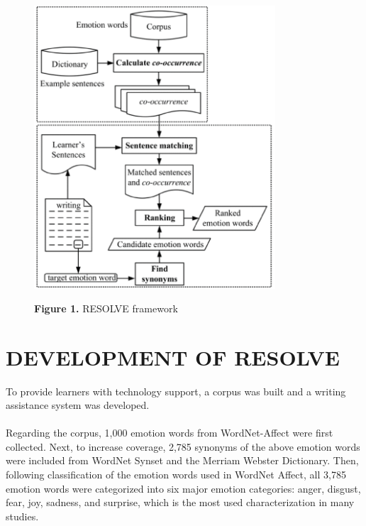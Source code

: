 \documentclass[a4paper,12pt,oneside]{article}
\let\counterwithin\relax
\begin{document}
\begin{figure}[H]
\includegraphics[height=11.25cm,width=9cm]{Figure1.png}
\centering
\caption{ \textbf{Figure 1.} RESOLVE framework}
\end{figure}

\newpage
\section{DEVELOPMENT OF RESOLVE}
To provide learners with technology support, a corpus was built and a writing assistance system was developed. 
\paragraph{}
Regarding the corpus, 1,000 emotion words from WordNet-Affect were first collected. Next, to increase coverage, 2,785 synonyms of the above emotion words were included from WordNet Synset and the Merriam Webster Dictionary. Then, following classification of the emotion words used in WordNet Affect, all 3,785 emotion words were categorized into six major emotion categories: anger, disgust, fear, joy, sadness, and surprise, which is the most used characterization in many studies. 
\end{document}
